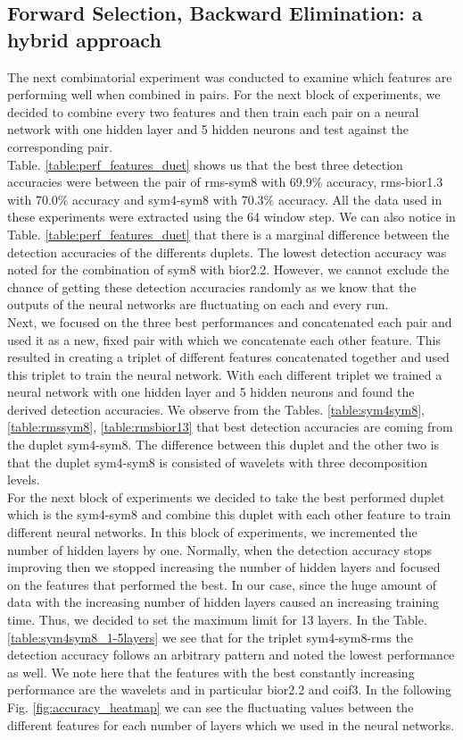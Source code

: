 \subsection{Forward Selection, Backward Elimination: a hybrid approach}
The next combinatorial experiment was conducted to examine which features are performing well when combined in pairs. For the next block of experiments, we decided to combine every two features and then train each pair on a neural network with one hidden layer and 5 hidden neurons and test against the corresponding pair.\\
 Table. \ref{table:perf_features_duet} shows us that the best three detection accuracies were between the pair of rms-sym8 with 69.9\% accuracy, rms-bior1.3 with 70.0\% accuracy and sym4-sym8 with 70.3\% accuracy. All the data used in these experiments were extracted using the 64 window step. We can also notice in Table. \ref{table:perf_features_duet} that there is a marginal difference between the detection accuracies of the differents duplets. The lowest detection accuracy was noted for the combination of sym8 with bior2.2. However, we cannot exclude the chance of getting these detection accuracies randomly as we know that the outputs of the neural networks are fluctuating on each and every run.\\
Next, we focused on the three best performances and concatenated each pair and used it as a new, fixed pair with which we concatenate each other feature. This resulted in creating a triplet of different features concatenated together and used this triplet to train the neural network. With each different triplet we trained a neural network with one hidden layer and 5 hidden neurons and found the derived detection accuracies. We observe from the Tables. \ref{table:sym4sym8}, \ref{table:rmssym8}, \ref{table:rmsbior13} that best detection accuracies are coming from the duplet sym4-sym8. The difference between this duplet and the other two is that the duplet sym4-sym8 is consisted of wavelets with three decomposition levels.\\
For the next block of experiments we decided to take the best performed duplet which is the sym4-sym8 and combine this duplet with each other feature to train different neural networks. In this block of experiments, we incremented the number of hidden layers by one. Normally, when the detection accuracy stops improving then we stopped increasing the number of hidden layers and focused on the features that performed the best. In our case, since the  huge amount of data with the increasing number of hidden layers caused an increasing training time. Thus,  we decided to set the maximum limit for 13 layers. In the Table. \ref{table:sym4sym8_1-5layers} we see that for the triplet sym4-sym8-rms the detection accuracy follows an arbitrary pattern and noted the lowest performance as well. We note here that the features with  the best constantly increasing performance are the wavelets and in particular bior2.2 and coif3. In the following Fig. \ref{fig:accuracy_heatmap} we can see the fluctuating values between the different features for each number of layers which we used in the neural networks.
